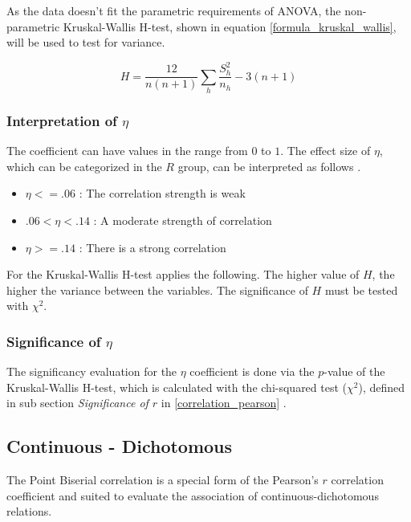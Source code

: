 \documentclass[a4paper,12pt]{report}
\begin{document}
As the data doesn't fit the parametric requirements of ANOVA, the non-parametric Kruskal-Wallis H-test, shown in equation \ref{formula_kruskal_wallis}, will be used to test for variance.

\smallskip
\begin{equation}
\label{formula_kruskal_wallis}	
	H = \frac{12}{n(n+1)}\sum_{h}{\frac{S_h^2}{n_h}}-3(n+1)
\end{equation}

\subsubsection{Interpretation of $\eta$}
The coefficient can have values in the range from $0$ to $1$. The effect size of $\eta$, which can be categorized in the $R$ group, can be interpreted as follows \cite{Regber2016,Cohen1988}.

\begin{itemize}
	\item $\eta <= .06$ : The correlation strength is weak
	\item $.06 < \eta < .14$ : A moderate strength of correlation
	\item $\eta >= .14$ : There is a strong correlation
\end{itemize}

For the Kruskal-Wallis H-test applies the following. The higher value of $H$, the higher the variance between the variables. The significance of $H$ must be tested with $\chi^2$.

\subsubsection{Significance of $\eta$}
The significancy evaluation for the $\eta$ coefficient is done via the $p$-value of the Kruskal-Wallis H-test, which is calculated with the chi-squared test ($\chi^2$), defined in sub section \textit{Significance of $r$} in \ref{correlation_pearson} \cite{Filipiak2013}.

\subsection{Continuous - Dichotomous}
The Point Biserial correlation is a special form of the Pearson's $r$ correlation coefficient and suited to evaluate the association of continuous-dichotomous relations. 
\end{document}
